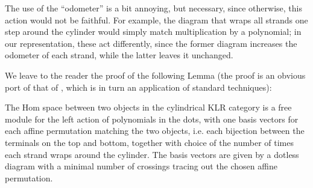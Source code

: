 The use of the ``odometer'' is a bit annoying, but necessary, since otherwise, this action would not be faithful. For example, the diagram that wraps all strands one step around the cylinder would simply match multiplication by a polynomial; in our representation, these act differently, since the former diagram increases the odometer of each strand, while the latter leaves it unchanged. 

We leave to the reader the proof of the following Lemma (the proof is an obvious port of that of \cite[Prop. 4.16]{Webmerged}, which is in turn an application of standard techniques):
\begin{lemma}\label{lem:cyl-basis}
The Hom space between two objects in the cylindrical KLR category is a free module for the left action of polynomials in the dots, with one basis vectors for each affine permutation matching the two objects, i.e. each bijection between the terminals on the top and bottom, together with choice of the number of times each strand wraps around the cylinder.  The basis vectors are given by a dotless diagram with a minimal number of crossings tracing out the chosen affine permutation.
\end{lemma}


